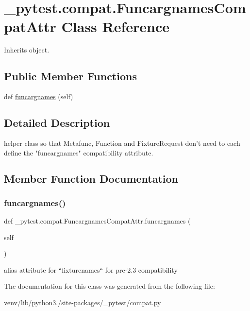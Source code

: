 \hypertarget{class__pytest_1_1compat_1_1_funcargnames_compat_attr}{}\section{\+\_\+pytest.\+compat.\+Funcargnames\+Compat\+Attr Class Reference}
\label{class__pytest_1_1compat_1_1_funcargnames_compat_attr}


Inherits object.

\subsection*{Public Member Functions}
\begin{DoxyCompactItemize}
\item 
def \hyperlink{class__pytest_1_1compat_1_1_funcargnames_compat_attr_a627b521306634052dfe57c6f7673381e}{funcargnames} (self)
\end{DoxyCompactItemize}


\subsection{Detailed Description}
\begin{DoxyVerb}helper class so that Metafunc, Function and FixtureRequest
don't need to each define the "funcargnames" compatibility attribute.
\end{DoxyVerb}
 

\subsection{Member Function Documentation}
\mbox{\label{class__pytest_1_1compat_1_1_funcargnames_compat_attr_a627b521306634052dfe57c6f7673381e}} 
\subsubsection{\texorpdfstring{funcargnames()}{funcargnames()}}
{\footnotesize\ttfamily def \+\_\+pytest.\+compat.\+Funcargnames\+Compat\+Attr.\+funcargnames (\begin{DoxyParamCaption}\item[{}]{self }\end{DoxyParamCaption})}

\begin{DoxyVerb}alias attribute for ``fixturenames`` for pre-2.3 compatibility\end{DoxyVerb}
 

The documentation for this class was generated from the following file\+:\begin{DoxyCompactItemize}
\item 
venv/lib/python3./site-\/packages/\+\_\+pytest/compat.\+py\end{DoxyCompactItemize}
